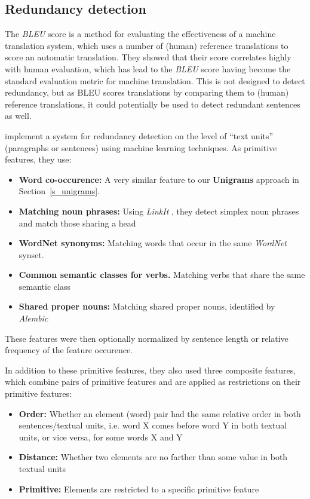 \documentclass[a4paper,10pt]{scrartcl}
\theoremstyle{style}
\begin{document}
\subsection{Redundancy detection}

The \textit{BLEU} score \citep{papineni2002bleu} is a method for evaluating the effectiveness of a machine translation system, which uses a number of (human) reference translations to score an automatic translation. They showed that their score correlates highly with human evaluation, which has lead to the \textit{BLEU} score having become the standard evaluation metric for machine translation.
This is not designed to detect redundancy, but as BLEU scores translations by comparing them to (human) reference translations, it could potentially be used to detect redundant sentences as well.

\cite{hatzivassiloglou1999detecting} implement a system for redundancy detection on the level of ``text units'' (paragraphs or sentences) using machine learning techniques. As primitive features, they use:

\begin{itemize}
	\item \textbf{Word co-occurence:} A very similar feature to our \textbf{Unigrams} approach in Section~\ref{s_unigrams}.
	\item \textbf{Matching noun phrases:} Using \textit{LinkIt} \citep{wacholder1998simplex}, they detect simplex noun phrases and match those sharing a head
	\item \textbf{WordNet synonyms:} Matching words that occur in the same \textit{WordNet} \citep{fellbaum2005wordnet} synset.
	\item \textbf{Common semantic classes for verbs.} Matching verbs that share the same semantic class \citep{levin1993english}
	\item \textbf{Shared proper nouns:} Matching shared proper nouns, identified by \textit{Alembic} \citep{aberdeen1995mitre}
\end{itemize}

These features were then optionally normalized by sentence length or relative frequency of the feature occurence.

In addition to these primitive features, they also used three composite features, which combine pairs of primitive features and are applied as restrictions on their primitive features:

\begin{itemize}
	\item \textbf{Order:} Whether an element (word) pair had the same relative order in both sentences/textual units, i.e. word X comes before word Y in both textual units, or vice versa, for some words X and Y
	\item \textbf{Distance:} Whether two elements are no farther than some value in both textual units
	\item \textbf{Primitive:} Elements are restricted to a specific primitive feature
\end{itemize}
\end{document}
